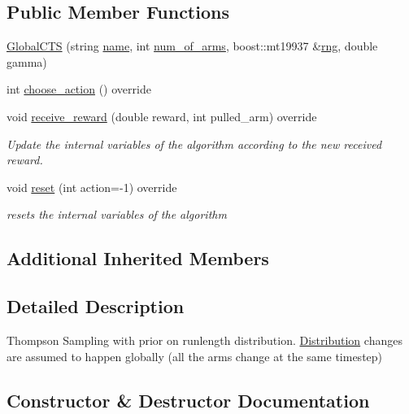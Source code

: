 \subsection*{Public Member Functions}
\begin{DoxyCompactItemize}
\item 
\mbox{\hyperlink{class_global_c_t_s_a04fe6aa2e0a554e5e2e1edad47ecabe1}{Global\+C\+TS}} (string \mbox{\hyperlink{class_m_a_b_algorithm_a77b10ecc4b49d519c557f65358167b82}{name}}, int \mbox{\hyperlink{class_m_a_b_algorithm_a340fa9e83e85b092f2c6125fc4e8549b}{num\+\_\+of\+\_\+arms}}, boost\+::mt19937 \&\mbox{\hyperlink{class_thompson_sampling_a1b66efa9bb0912df92975147f8923216}{rng}}, double gamma)
\item 
int \mbox{\hyperlink{class_global_c_t_s_a48f9873be9f993e78fdbdd93ad4806bc}{choose\+\_\+action}} () override
\item 
void \mbox{\hyperlink{class_global_c_t_s_acb2f35fa8c6b2ae61912f6f337ed815f}{receive\+\_\+reward}} (double reward, int pulled\+\_\+arm) override
\begin{DoxyCompactList}\small\item\em Update the internal variables of the algorithm according to the new received reward. \end{DoxyCompactList}\item 
void \mbox{\hyperlink{class_global_c_t_s_a1e2c899b85ec7adf92a28ac758f556b5}{reset}} (int action=-\/1) override
\begin{DoxyCompactList}\small\item\em resets the internal variables of the algorithm \end{DoxyCompactList}\end{DoxyCompactItemize}
\subsection*{Additional Inherited Members}


\subsection{Detailed Description}
Thompson Sampling with prior on runlength distribution. \mbox{\hyperlink{class_distribution}{Distribution}} changes are assumed to happen globally (all the arms change at the same timestep) 

\subsection{Constructor \& Destructor Documentation}
\mbox{\label{class_global_c_t_s_a04fe6aa2e0a554e5e2e1edad47ecabe1}} 
